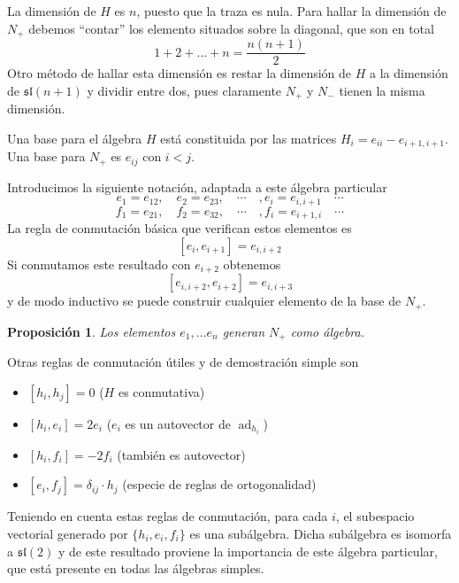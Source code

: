 \documentclass[a4paper,draft,12pt]{article}
\newtheorem{propo}[teo]{Proposición}%
\DeclareMathOperator{\ad}{ad}  %
\begin{document}
La dimensión de $H$ es $n$, puesto que la traza es nula.  Para hallar la dimensión de $N_+$ debemos ``contar'' los elemento situados sobre la diagonal, que son en total
$$
1+2+ \dots+ n= \frac{n(n+1)}{2}
$$
Otro método de hallar esta dimensión es restar la dimensión de $H$ a la dimensión de $\mathfrak{sl}(n+1)$ y dividir entre dos, pues claramente $N_+$ y $N_-$ tienen la misma dimensión.

\bigskip

Una base para el álgebra $H$ está constituida por las matrices $H_i= e_{ii}-e_{i+1,i+1}$.  Una base para $N_+$ es $e_{ij}$ con $i<j$.

Introducimos la siguiente notación, adaptada a este álgebra particular
$$
e_1 =e_{12}, \quad e_2= e_{23}, \quad  \cdots\quad, e_i = e_{i,i+1}\quad \cdots
$$
$$
f_1 =e_{21}, \quad f_2= e_{32}, \quad  \cdots\quad, f_i = e_{i+1,i}\quad \cdots
$$
La regla de conmutación básica que verifican estos elementos es
$$
[e_i,e_{i+1}]= e_{i,i+2}
$$
Si conmutamos este resultado con $e_{i+2}$ obtenemos
$$
[e_{i,i+2},e_{i+2}]= e_{i,i+3}
$$
y de modo inductivo se puede construir cualquier elemento de la base de $N_+$.

\begin{propo}

Los elementos $e_1, \dots e_n$ generan $N_+$ como álgebra.

\end{propo}

Otras reglas de conmutación útiles y de demostración simple son

\begin{itemize}

\item $[h_i,h_j]=0$ ($H$ es conmutativa)

\item $[h_i,e_i]= 2e_i$ ($e_i$ es un autovector de $ \ad_{h_i}$)

\item $[h_i, f_i]= -2f_i$ (también es autovector)

\item $[e_i,f_j]= \delta_{ij} \cdot h_j$ (especie de reglas de ortogonalidad) 

\end{itemize}


Teniendo en cuenta estas reglas de conmutación, para cada $i$, el subespacio vectorial generado por $\{h_i,e_i,f_i\}$ es una subálgebra.  Dicha subálgebra es isomorfa a $\mathfrak{sl}(2) $ y de este resultado proviene la importancia de este álgebra particular, que está presente en todas las álgebras simples.
\end{document}
